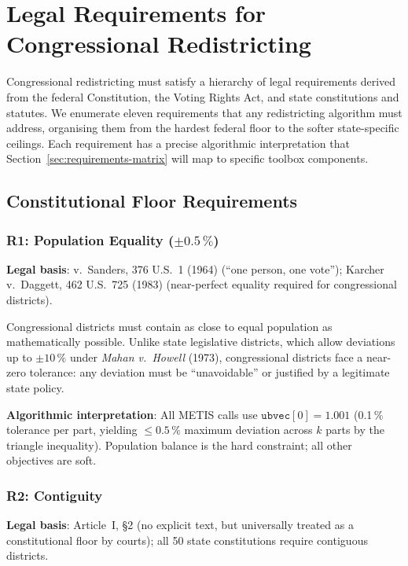 \section{Legal Requirements for Congressional Redistricting}
\label{sec:legal-requirements}

Congressional redistricting must satisfy a hierarchy of legal requirements
derived from the federal Constitution, the Voting Rights Act, and state
constitutions and statutes.
We enumerate eleven requirements that any redistricting algorithm must address,
organising them from the hardest federal floor to the softer state-specific ceilings.
Each requirement has a precise algorithmic interpretation that Section~\ref{sec:requirements-matrix}
will map to specific toolbox components.

\subsection{Constitutional Floor Requirements}

\subsubsection*{R1: Population Equality ($\pm 0.5\,\%$)}

\textbf{Legal basis}: \wesberry{} v.\ Sanders, 376 U.S.\ 1 (1964) (``one person,
one vote''); Karcher v.\ Daggett, 462 U.S.\ 725 (1983) (near-perfect equality
required for congressional districts).

Congressional districts must contain as close to equal population as mathematically
possible.
Unlike state legislative districts, which allow deviations up to $\pm 10\,\%$
under \emph{Mahan v.\ Howell} (1973), congressional districts face a near-zero
tolerance: any deviation must be ``unavoidable'' or justified by a legitimate
state policy.

\textbf{Algorithmic interpretation}: All METIS calls use $\mathtt{ubvec}[0] = 1.001$
(0.1\,\% tolerance per part, yielding $\leq 0.5\,\%$ maximum deviation across $k$
parts by the triangle inequality).
Population balance is the hard constraint; all other objectives are soft.

\subsubsection*{R2: Contiguity}

\textbf{Legal basis}: Article~I, \S2 (no explicit text, but universally treated
as a constitutional floor by courts); all 50 state constitutions require contiguous
districts.

